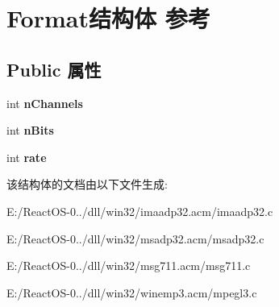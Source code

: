 \hypertarget{struct_format}{}\section{Format结构体 参考}
\label{struct_format}
\subsection*{Public 属性}
\begin{DoxyCompactItemize}
\item 
\mbox{\label{struct_format_a16cdf5dae16b8e8ed290c0c111245824}} 
int {\bfseries n\+Channels}
\item 
\mbox{\label{struct_format_a371bc252600173e5a5475f96f163b1a1}} 
int {\bfseries n\+Bits}
\item 
\mbox{\label{struct_format_ac2bdcd090ae5f8d6f9301f75675dae7e}} 
int {\bfseries rate}
\end{DoxyCompactItemize}


该结构体的文档由以下文件生成\+:\begin{DoxyCompactItemize}
\item 
E\+:/\+React\+O\+S-\/0../dll/win32/imaadp32.\+acm/imaadp32.\+c\item 
E\+:/\+React\+O\+S-\/0../dll/win32/msadp32.\+acm/msadp32.\+c\item 
E\+:/\+React\+O\+S-\/0../dll/win32/msg711.\+acm/msg711.\+c\item 
E\+:/\+React\+O\+S-\/0../dll/win32/winemp3.\+acm/mpegl3.\+c\end{DoxyCompactItemize}
